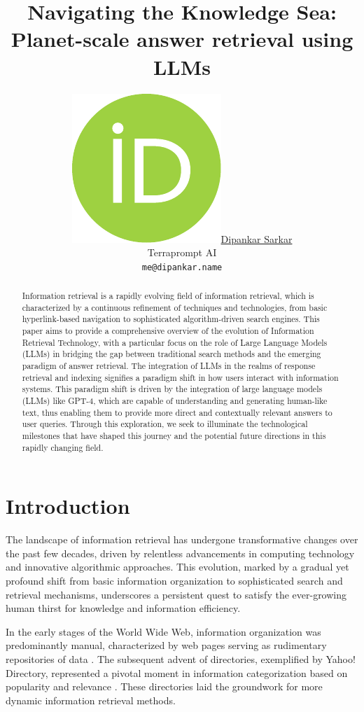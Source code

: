 \documentclass{article}
\title{Navigating the Knowledge Sea: Planet-scale answer retrieval using LLMs}
\author{ \href{https://orcid.org/0000-0001-5431-6367}{\includegraphics[scale=0.06]{orcid.pdf}\hspace{1mm}Dipankar Sarkar} \\
  Terraprompt AI \\
  \texttt{me@dipankar.name} \\
}
\begin{document}
\maketitle

\begin{abstract}
Information retrieval is a rapidly evolving field of information retrieval, which is characterized by a continuous refinement of techniques and technologies, from basic hyperlink-based navigation to sophisticated algorithm-driven search engines. This paper aims to provide a comprehensive overview of the evolution of Information Retrieval Technology, with a particular focus on the role of Large Language Models (LLMs) in bridging the gap between traditional search methods and the emerging paradigm of answer retrieval. The integration of LLMs in the realms of response retrieval and indexing signifies a paradigm shift in how users interact with information systems. This paradigm shift is driven by the integration of large language models (LLMs) like GPT-4, which are capable of understanding and generating human-like text, thus enabling them to provide more direct and contextually relevant answers to user queries. Through this exploration, we seek to illuminate the technological milestones that have shaped this journey and the potential future directions in this rapidly changing field.
\end{abstract}






\section{Introduction}
The landscape of information retrieval has undergone transformative changes over the past few decades, driven by relentless advancements in computing technology and innovative algorithmic approaches. This evolution, marked by a gradual yet profound shift from basic information organization to sophisticated search and retrieval mechanisms, underscores a persistent quest to satisfy the ever-growing human thirst for knowledge and information efficiency.

In the early stages of the World Wide Web, information organization was predominantly manual, characterized by web pages serving as rudimentary repositories of data \citep{berners1994world}. The subsequent advent of directories, exemplified by Yahoo! Directory, represented a pivotal moment in information categorization based on popularity and relevance \citep{hock2005yahoo}. These directories laid the groundwork for more dynamic information retrieval methods.
\end{document}
